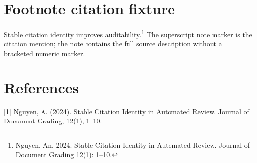 \documentclass[10pt]{article}
\begin{document}
\section*{Footnote citation fixture}

Stable citation identity improves auditability.\footnote{Nguyen, An. 2024. Stable Citation Identity in Automated Review. Journal of Document Grading 12(1): 1--10.}
The superscript note marker is the citation mention; the note contains the full source description without a bracketed numeric marker.

\section*{References}

[1] Nguyen, A. (2024). Stable Citation Identity in Automated Review. Journal of Document Grading, 12(1), 1--10.
\end{document}
